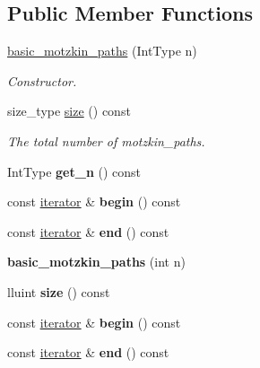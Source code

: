 \subsection*{Public Member Functions}
\begin{DoxyCompactItemize}
\item 
\hyperlink{classdscr_1_1basic__motzkin__paths_a987a2d177105de1c2df2e973093ff53b}{basic\-\_\-motzkin\-\_\-paths} (Int\-Type n)
\begin{DoxyCompactList}\small\item\em Constructor. \end{DoxyCompactList}\item 
size\-\_\-type \hyperlink{classdscr_1_1basic__motzkin__paths_a51f3f118d5aaa81c079d827639d3557a}{size} () const 
\begin{DoxyCompactList}\small\item\em The total number of motzkin\-\_\-paths. \end{DoxyCompactList}\item 
\hypertarget{classdscr_1_1basic__motzkin__paths_a2cde9832f0496cf7e7fb2f75e490cc73}{Int\-Type {\bfseries get\-\_\-n} () const }\label{classdscr_1_1basic__motzkin__paths_a2cde9832f0496cf7e7fb2f75e490cc73}

\item 
\hypertarget{classdscr_1_1basic__motzkin__paths_a31f16bb69beacb46f8eb146bfe92fed5}{const \hyperlink{classdscr_1_1basic__motzkin__paths_1_1iterator}{iterator} \& {\bfseries begin} () const }\label{classdscr_1_1basic__motzkin__paths_a31f16bb69beacb46f8eb146bfe92fed5}

\item 
\hypertarget{classdscr_1_1basic__motzkin__paths_a78d85f017334a36994a2016571f72411}{const \hyperlink{classdscr_1_1basic__motzkin__paths_1_1iterator}{iterator} \& {\bfseries end} () const }\label{classdscr_1_1basic__motzkin__paths_a78d85f017334a36994a2016571f72411}

\item 
\hypertarget{classdscr_1_1basic__motzkin__paths_a2da82f7357b413fe75e0afec4a1d1c70}{{\bfseries basic\-\_\-motzkin\-\_\-paths} (int n)}\label{classdscr_1_1basic__motzkin__paths_a2da82f7357b413fe75e0afec4a1d1c70}

\item 
\hypertarget{classdscr_1_1basic__motzkin__paths_a28e04228d3d69a3240dd3997d8f4694b}{lluint {\bfseries size} () const }\label{classdscr_1_1basic__motzkin__paths_a28e04228d3d69a3240dd3997d8f4694b}

\item 
\hypertarget{classdscr_1_1basic__motzkin__paths_a31f16bb69beacb46f8eb146bfe92fed5}{const \hyperlink{classdscr_1_1basic__motzkin__paths_1_1iterator}{iterator} \& {\bfseries begin} () const }\label{classdscr_1_1basic__motzkin__paths_a31f16bb69beacb46f8eb146bfe92fed5}

\item 
\hypertarget{classdscr_1_1basic__motzkin__paths_a78d85f017334a36994a2016571f72411}{const \hyperlink{classdscr_1_1basic__motzkin__paths_1_1iterator}{iterator} \& {\bfseries end} () const }\label{classdscr_1_1basic__motzkin__paths_a78d85f017334a36994a2016571f72411}

\end{DoxyCompactItemize}
